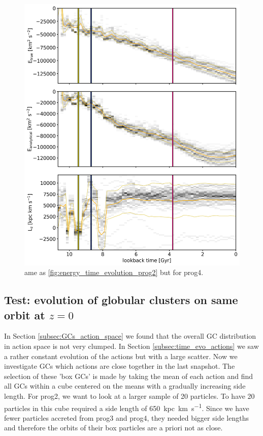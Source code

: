 \begin{figure}[htbp]
\captionsetup{format=plain}
    \centering
	\includegraphics[width=\textwidth]{plots/Dynamics/prog4/energy_time_evolution_hist_mean.png}
    \caption{ame as \ref{fig:energy_time_evolution_prog2} but for prog4.}\label{fig:energy_time_evolution_prog4}
\end{figure}
\fi

\subsection{Test: evolution of globular clusters on same orbit at $z=0$}\label{subsec:box_GCs}
In Section \ref{subsec:GCs_action_space} we found that the overall \ac{GC} distribution in action space is not very clumped. In Section \ref{subsec:time_evo_actions} we saw a rather constant evolution of the actions but with a large scatter. Now we investigate \acp{GC} which actions are close together in the last snapshot. The selection of these 'box \acp{GC}' is made by taking the mean of each action and find all \acp{GC} within a cube centered on the means with a gradually increasing side length. For prog2, we want to look at a larger sample of 20 particles. To have 20 particles in this cube required a side length of \SI{650}{kpc.km.s^{-1}}. Since we have fewer particles accreted from prog3 and prog4, they needed bigger side lengths and therefore the orbits of their box particles are a priori not as close.  

